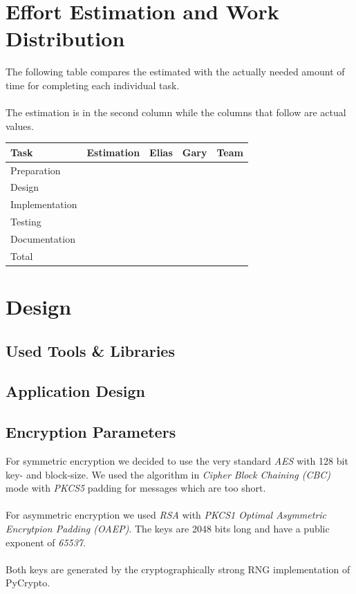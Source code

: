 \documentclass[11pt, a4paper]{article}
\begin{document}
\section{Effort Estimation and Work Distribution}

The following table compares the estimated with the actually needed
amount of time for completing each individual task.
\\\\
The estimation is in the second column while the columns that follow
are actual values.

\parskip 12pt
\begin{tabular} {| l | c | c | c | c |}
	\hline
	Task					&	Estimation		& 	Elias 	& 	Gary 	& 	Team	\\ \hline \hline
	Preparation				&					&			&  			&			\\ \hline
	Design					&					&			&			&			\\ \hline
	Implementation			&					&			&			& 	 		\\ \hline
	Testing					&					&			& 			& 	 		\\ \hline
	Documentation			&					&			&			& 			\\ \hline 
	Total					&					&			&			& 			\\
	\hline
\end{tabular}

\newpage

\section{Design}
\label{sec:design}
\subsection{Used Tools \& Libraries}

\subsection{Application Design}

\subsection{Encryption Parameters}

For symmetric encryption we decided to use the very standard \textit{AES} with
128 bit key- and block-size. We used the algorithm in \textit{Cipher Block
	Chaining (CBC)} mode with \textit{PKCS5} padding for messages which are too
short.
\\\\
For asymmetric encryption we used \textit{RSA} with \textit{PKCS1 Optimal
	Asymmetric Encrytpion Padding (OAEP)}. The keys are 2048 bits long and have a
public exponent of \textit{65537}.
\\\\
Both keys are generated by the cryptographically strong RNG implementation of
PyCrypto.
\end{document}
